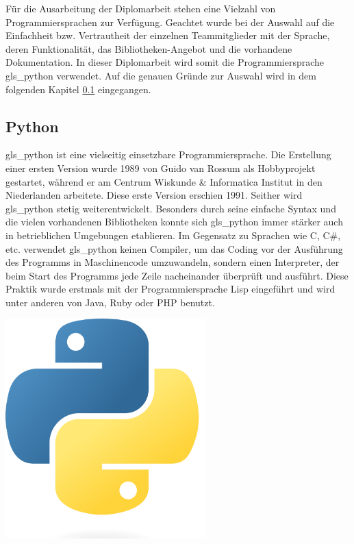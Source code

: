 Für die Ausarbeitung der Diplomarbeit stehen eine Vielzahl von Programmiersprachen zur Verfügung. Geachtet wurde bei der Auswahl auf die Einfachheit bzw. Vertrautheit der einzelnen Teammitglieder mit der Sprache, deren Funktionalität, das Bibliotheken-Angebot und die vorhandene Dokumentation. In dieser Diplomarbeit wird somit die Programmiersprache \gls{gls_python} verwendet. Auf die genauen Gründe zur Auswahl wird in dem folgenden Kapitel \ref{python_kapitel} eingegangen.

\subsection{Python}\label{python_kapitel}
\begin{minipage}{0.6\textwidth}
	\gls{gls_python} ist eine vielseitig einsetzbare Programmiersprache. Die Erstellung einer ersten Version wurde 1989 von Guido van Rossum als Hobbyprojekt gestartet, während er am Centrum Wiskunde \& Informatica Institut in den Niederlanden arbeitete. Diese erste Version erschien 1991. Seither wird \gls{gls_python} stetig weiterentwickelt. Besonders durch seine einfache Syntax und die vielen vorhandenen Bibliotheken konnte sich \gls{gls_python} immer stärker auch in betrieblichen Umgebungen etablieren. Im Gegensatz zu Sprachen wie C, C\#, etc. verwendet \gls{gls_python} keinen Compiler, um das Coding vor der Ausführung des Programms in Maschinencode umzuwandeln, sondern einen Interpreter, der beim Start des Programms jede Zeile nacheinander überprüft und ausführt. Diese Praktik wurde erstmals mit der Programmiersprache Lisp eingeführt und wird unter anderen von Java, Ruby oder PHP benutzt. 
	\cite{Python_Software_Foundation:o.J., Pramanick_gfg:2019, Ryte:2021}
\end{minipage}%
\hfill
\begin{minipage}{0.37\textwidth}
	\centering	
	\includegraphics[width=0.58\textwidth]{Bilder/Python_logo}
\end{minipage}
\vspace{1ex}

